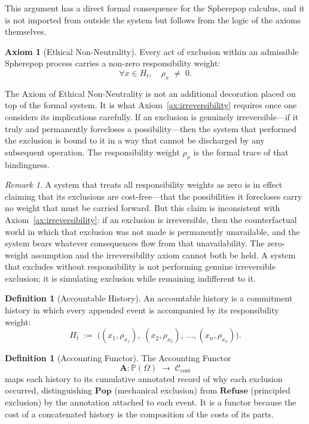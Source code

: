 \documentclass[12pt]{article}
\theoremstyle{plain}
\theoremstyle{definition}
\newtheorem{definition}[theorem]{Definition}
\newtheorem{axiom}[theorem]{Axiom}
\theoremstyle{remark}
\newtheorem{remark}[theorem]{Remark}
\newcommand{\Pop}{\mathbf{Pop}}
\newcommand{\Refuse}{\mathbf{Refuse}}
\newcommand{\PathCat}{\mathbb{P}(\Omega)}
\newcommand{\rweight}{\rho}
\newcommand{\Acct}{\mathbf{A}}
\begin{document}
This argument has a direct formal consequence for the Spherepop calculus, and
it is not imported from outside the system but follows from the logic of the
axioms themselves.

\begin{axiom}[Ethical Non-Neutrality]
\label{ax:non-neutrality}
Every act of exclusion within an admissible Spherepop process carries a
non-zero responsibility weight:
\[
  \forall x \in H_t, \quad \rweight_x \;\neq\; 0.
\]
\end{axiom}

The Axiom of Ethical Non-Neutrality is not an additional decoration placed on
top of the formal system.  It is what Axiom~\ref{ax:irreversibility} requires
once one considers its implications carefully.  If an exclusion is genuinely
irreversible---if it truly and permanently forecloses a possibility---then the
system that performed the exclusion is bound to it in a way that cannot be
discharged by any subsequent operation.  The responsibility weight $\rweight_x$
is the formal trace of that bindingness.

\begin{remark}
A system that treats all responsibility weights as zero is in effect claiming
that its exclusions are cost-free---that the possibilities it forecloses carry
no weight that must be carried forward.  But this claim is inconsistent with
Axiom~\ref{ax:irreversibility}: if an exclusion is irreversible, then the
counterfactual world in which that exclusion was not made is permanently
unavailable, and the system bears whatever consequences flow from that
unavailability.  The zero-weight assumption and the irreversibility axiom cannot
both be held.  A system that excludes without responsibility is not performing
genuine irreversible exclusion; it is simulating exclusion while remaining
indifferent to it.
\end{remark}

\begin{definition}[Accountable History]
An accountable history is a commitment history in which every appended event is
accompanied by its responsibility weight:
\[
  H_t \;:=\; \bigl((x_1, \rweight_{x_1}),\; (x_2, \rweight_{x_2}),\; \ldots,
  (x_n, \rweight_{x_n})\bigr).
\]
\end{definition}

\begin{definition}[Accounting Functor]
The Accounting Functor
\[
  \Acct : \PathCat \;\longrightarrow\; \mathcal{C}_{\mathrm{cost}}
\]
maps each history to its cumulative annotated record of why each exclusion
occurred, distinguishing $\Pop$ (mechanical exclusion) from $\Refuse$
(principled exclusion) by the annotation attached to each event.  It is a
functor because the cost of a concatenated history is the composition of the
costs of its parts.
\end{definition}
\end{document}

